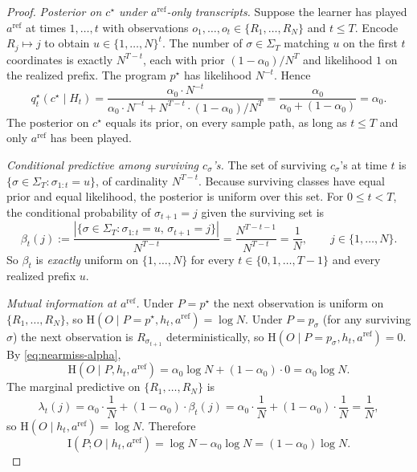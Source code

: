 \documentclass[11pt]{article}
\theoremstyle{definition}
\theoremstyle{remark}
\newcommand{\I}{\mathrm{I}}
\newcommand{\Hh}{\mathrm{H}}
\begin{document}
\begin{proof}
\emph{Posterior on $c^\star$ under $a^{\mathrm{ref}}$-only transcripts.} Suppose the learner has played $a^{\mathrm{ref}}$ at times $1,\dots,t$ with observations $o_1,\dots,o_t\in\{R_1,\dots,R_N\}$ and $t\le T$. Encode $R_j\mapsto j$ to obtain $u\in\{1,\dots,N\}^t$. The number of $\sigma\in\Sigma_T$ matching $u$ on the first $t$ coordinates is exactly $N^{T-t}$, each with prior $(1-\alpha_0)/N^T$ and likelihood $1$ on the realized prefix. The program $p^\star$ has likelihood $N^{-t}$. Hence
\begin{equation}
\label{eq:nearmiss-alpha}
q_t^\star(c^\star\mid H_t)=\frac{\alpha_0\cdot N^{-t}}{\alpha_0\cdot N^{-t}+N^{T-t}\cdot (1-\alpha_0)/N^T}=\frac{\alpha_0}{\alpha_0+(1-\alpha_0)}=\alpha_0.
\end{equation}
The posterior on $c^\star$ equals its prior, on every sample path, as long as $t\le T$ and only $a^{\mathrm{ref}}$ has been played.

\emph{Conditional predictive among surviving $c_\sigma$'s.} The set of surviving $c_\sigma$'s at time $t$ is $\{\sigma\in\Sigma_T:\sigma_{1:t}=u\}$, of cardinality $N^{T-t}$. Because surviving classes have equal prior and equal likelihood, the posterior is uniform over this set. For $0\le t<T$, the conditional probability of $\sigma_{t+1}=j$ given the surviving set is
\[
\beta_t(j):=\frac{|\{\sigma\in\Sigma_T:\sigma_{1:t}=u,\,\sigma_{t+1}=j\}|}{N^{T-t}}=\frac{N^{T-t-1}}{N^{T-t}}=\frac{1}{N},
\qquad j\in\{1,\dots,N\}.
\]
So $\beta_t$ is \emph{exactly} uniform on $\{1,\dots,N\}$ for every $t\in\{0,1,\dots,T-1\}$ and every realized prefix $u$.

\emph{Mutual information at $a^{\mathrm{ref}}$.} Under $P=p^\star$ the next observation is uniform on $\{R_1,\dots,R_N\}$, so $\Hh(O\mid P=p^\star,h_t,a^{\mathrm{ref}})=\log N$. Under $P=p_\sigma$ (for any surviving $\sigma$) the next observation is $R_{\sigma_{t+1}}$ deterministically, so $\Hh(O\mid P=p_\sigma,h_t,a^{\mathrm{ref}})=0$. By \eqref{eq:nearmiss-alpha},
\[
\Hh(O\mid P,h_t,a^{\mathrm{ref}})=\alpha_0\log N+(1-\alpha_0)\cdot 0=\alpha_0\log N.
\]
The marginal predictive on $\{R_1,\dots,R_N\}$ is
\[
\lambda_t(j)=\alpha_0\cdot\frac{1}{N}+(1-\alpha_0)\cdot\beta_t(j)=\alpha_0\cdot\frac{1}{N}+(1-\alpha_0)\cdot\frac{1}{N}=\frac{1}{N},
\]
so $\Hh(O\mid h_t,a^{\mathrm{ref}})=\log N$. Therefore
\begin{equation}
\label{eq:mi-ref}
\I(P;O\mid h_t,a^{\mathrm{ref}})=\log N-\alpha_0\log N=(1-\alpha_0)\log N.
\end{equation}


\end{proof}
\end{document}
